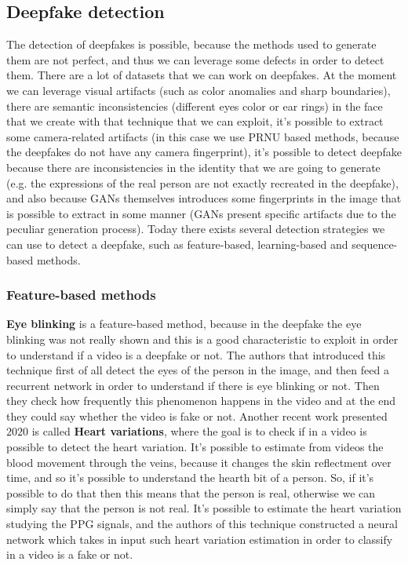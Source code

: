 \documentclass[11pt]{article}
\begin{document}
\subsection{Deepfake detection}
The detection of deepfakes is possible, because the methods used to generate them are not perfect, and thus we can leverage some defects in order to detect them. There are a lot of datasets that we can work on deepfakes. At the moment we can leverage visual artifacts (such as color anomalies and sharp boundaries), there are semantic inconsistencies (different eyes color or ear rings) in the face that we create with that technique that we can exploit, it's possible to extract some camera-related artifacts (in this case we use PRNU based methods, because the deepfakes do not have any camera fingerprint), it's possible to detect deepfake because there are inconsistencies in the identity that we are going to generate (e.g. the expressions of the real person are not exactly recreated in the deepfake), and also because GANs themselves introduces some fingerprints in the image that is possible to extract in some manner (GANs present specific artifacts due to the peculiar generation process). Today there exists several detection strategies we can use to detect a deepfake, such as feature-based, learning-based and sequence-based methods.


\subsubsection{Feature-based methods}
\textbf{Eye blinking} is a feature-based method, because in the deepfake the eye blinking was not really shown and this is a good characteristic to exploit in order to understand if a video is a deepfake or not. The authors that introduced this technique first of all detect the eyes of the person in the image, and then feed a recurrent network in order to understand if there is eye blinking or not. Then they check how frequently this phenomenon happens in the video and at the end they could say whether the video is fake or not. Another recent work presented $2020$ is called \textbf{Heart variations}, where the goal is to check if in a video is possible to detect the heart variation. It's possible to estimate from videos the blood movement through the veins, because it changes the skin reflectment over time, and so it's possible to understand the hearth bit of a person. So, if it's possible to do that then this means that the person is real, otherwise we can simply say that the person is not real. It's possible to estimate the heart variation studying the PPG signals, and the authors of this technique constructed a neural network which takes in input such heart variation estimation in order to classify in a video is a fake or not.
\end{document}
